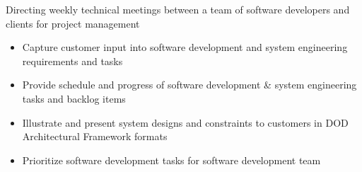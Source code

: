 \documentclass[letterpaper]{clinton-resume}
\begin{document}
\begin{minipage}[t]{0.66\textwidth}
\begin{tightitemize}
\item Directing weekly technical meetings between a team of software developers and clients for project management
	\begin{itemize}
	\item Capture customer input into software development and system engineering requirements and tasks
	\item Provide schedule and progress of software development \& system engineering tasks and backlog items
	\item Illustrate and present system designs and constraints to customers in DOD Architectural Framework formats
	\item Prioritize software development tasks for software development team
	\end{itemize}


\end{tightitemize}
\end{minipage}
\end{document}

